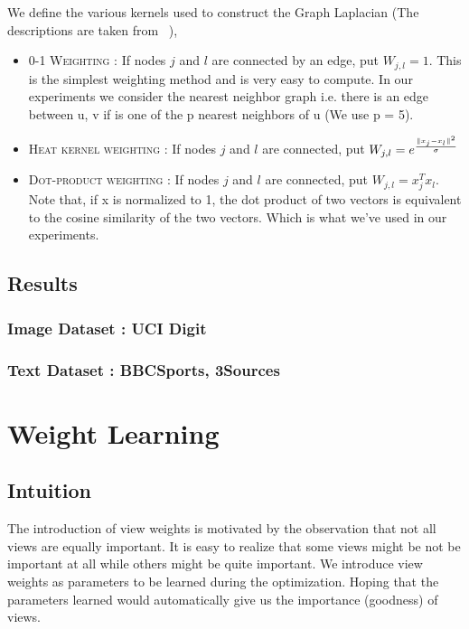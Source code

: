 \documentclass[a4paper]{article}
\begin{document}
	We define the various kernels used to construct the Graph Laplacian (The descriptions are taken from ~\cite{GReg}),
	\begin{itemize}
	\item \textsc{0-1 Weighting :} If nodes $j$ and $l$ are connected by an edge, put $W_{j,l} = 1$. This is the simplest weighting method and is very easy to compute. In our experiments we consider the nearest neighbor graph i.e. there is an edge between u, v if is one of the p nearest neighbors of u (We use p = 5).
	\item \textsc{Heat kernel weighting :} If nodes $j$ and $l$ are connected, put $W_{j,l} = e^{\frac{\|x_{j}-x_{l}\|^{\text{\tiny{2}}}}{\sigma}}$
	\item \textsc{Dot-product weighting :} If nodes $j$ and $l$ are connected, put $W_{j,l} = x^{T}_{j}x_{l}$. Note that, if x is normalized to 1, the dot product of two vectors is equivalent to the cosine similarity of the two vectors. Which is what we've used in our experiments.
	
	\end{itemize}	
	
	\subsection{Results}
	\subsubsection{Image Dataset : UCI Digit}
	\subsubsection{Text Dataset : BBCSports, 3Sources}
	
	\section{Weight Learning}
	
	\subsection{Intuition}
		
	The introduction of view weights is motivated by the observation that not all views are equally important. It is easy to realize that some views might be not be important at all while others might be quite important. We introduce view weights as parameters to be learned during the optimization. Hoping that the parameters learned would automatically give us the importance (goodness) of views.
\end{document}
